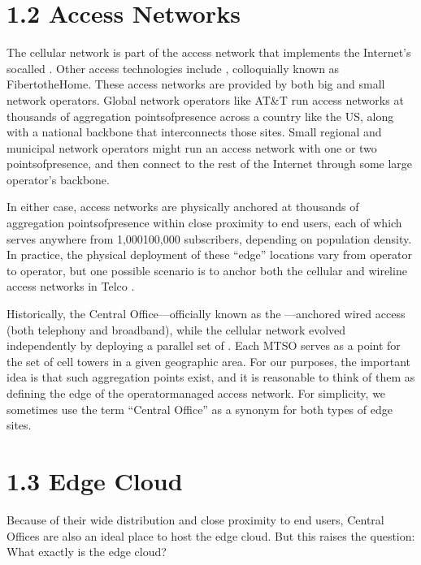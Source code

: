 \documentclass[a4paper,11pt,english]{sphinxmanual}
\begin{document}
\section{1.2 Access Networks}
\label{\detokenize{intro:access-networks}}
\sphinxAtStartPar
The cellular network is part of the access network that implements the
Internet’s so\sphinxhyphen{}called . Other access technologies include
, colloquially known as
Fiber\sphinxhyphen{}to\sphinxhyphen{}the\sphinxhyphen{}Home. These access networks are provided by both big and
small network operators. Global network operators like AT\&T run access
networks at thousands of aggregation points\sphinxhyphen{}of\sphinxhyphen{}presence across a
country like the US, along with a national backbone that interconnects
those sites. Small regional and municipal network operators might run
an access network with one or two points\sphinxhyphen{}of\sphinxhyphen{}presence, and then connect
to the rest of the Internet through some large operator’s backbone.

\sphinxAtStartPar
In either case, access networks are physically anchored at thousands of
aggregation points\sphinxhyphen{}of\sphinxhyphen{}presence within close proximity to end users,
each of which serves anywhere from 1,000\sphinxhyphen{}100,000 subscribers,
depending on population density. In practice, the physical deployment
of these “edge” locations vary from operator to operator, but one
possible scenario is to anchor both the cellular and wireline access
networks in Telco .

\sphinxAtStartPar
Historically, the Central Office—officially known as the —anchored wired
access (both telephony and broadband), while the cellular network
evolved independently by deploying a parallel set of . Each MTSO serves as a 
point for the set of cell towers in a given geographic area. For our
purposes, the important idea is that such aggregation points exist, and
it is reasonable to think of them as defining the edge of the
operator\sphinxhyphen{}managed access network. For simplicity, we sometimes use the
term “Central Office” as a synonym for both types of edge sites.


\section{1.3 Edge Cloud}
\label{\detokenize{intro:edge-cloud}}
\sphinxAtStartPar
Because of their wide distribution and close proximity to end users,
Central Offices are also an ideal place to host the edge cloud. But this
raises the question: What exactly is the edge cloud?
\end{document}
